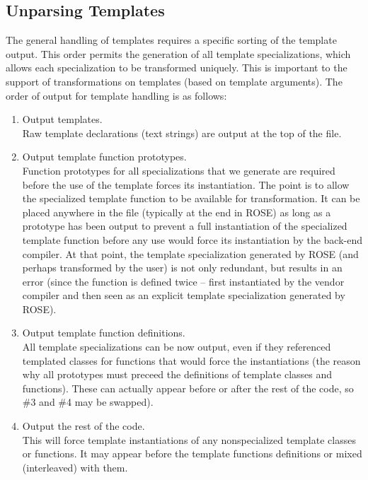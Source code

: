 \subsection{ Unparsing Templates }
   The general handling of templates requires a specific sorting of the template output.
This order permits the generation of all template specializations, which allows 
each specialization to be transformed uniquely.  This is important
to the support of transformations on templates (based on template arguments).
The order of output for template handling is as follows:
\begin{enumerate}
     \item Output templates. \\
           Raw template declarations (text strings) are output at the top of the file.

     \item Output template function prototypes. \\
           Function prototypes for all specializations that we generate are required
           before the use of the template forces its instantiation.  The point is to 
           allow the specialized template function to be available for transformation.
           It can be placed anywhere in the file (typically at the end in ROSE) as long
           as a prototype has been output to prevent a full instantiation of the
           specialized template function before any use would force its instantiation by
           the back-end compiler. At that point, the template specialization generated by 
           ROSE (and perhaps transformed by the user) is not only redundant, but results 
           in an error (since the function is defined twice -- first instantiated by the 
           vendor compiler and then seen as an explicit template specialization 
           generated by ROSE).

     \item Output template function definitions. \\
           All template specializations can be now output, even if they referenced 
           templated classes for functions that would force the instantiations (the 
           reason why all prototypes must preceed the definitions of template classes 
           and functions).  These can actually appear before or after the rest of the 
           code, so \#3 and \#4 may be swapped).

     \item Output the rest of the code. \\
           This will force template instantiations of any nonspecialized template classes
           or functions.  It may appear before the template functions definitions or mixed
           (interleaved) with them.


\end{enumerate}
